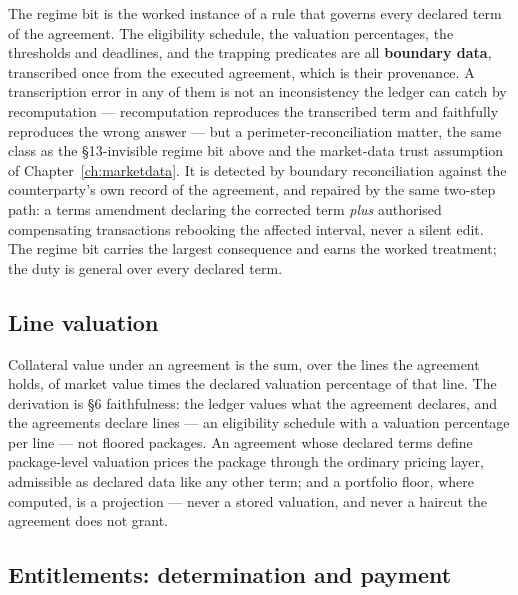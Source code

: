 \documentclass[11pt,a4paper]{article}
\begin{document}
\medskip
The regime bit is the worked instance of a rule that governs every declared term of the
agreement. The eligibility schedule, the valuation percentages, the thresholds and
deadlines, and the trapping predicates are all \textbf{boundary data}, transcribed once
from the executed agreement, which is their provenance. A transcription error in any of
them is not an inconsistency the ledger can catch by recomputation --- recomputation
reproduces the transcribed term and faithfully reproduces the wrong answer --- but a
perimeter-reconciliation matter, the same class as the \S13-invisible regime bit above
and the market-data trust assumption of Chapter~\ref{ch:marketdata}. It is detected by
boundary reconciliation against the counterparty's own record of the agreement, and
repaired by the same two-step path: a terms amendment declaring the corrected term
\emph{plus} authorised compensating transactions rebooking the affected interval, never a silent
edit. The regime bit carries the largest consequence and earns the worked treatment;
the duty is general over every declared term.

\subsection{Line valuation}

Collateral value under an agreement is the sum, over the lines the agreement
holds, of market value times the declared valuation percentage of that line.
The derivation is \S6 faithfulness: the ledger values what the agreement
declares, and the agreements declare lines --- an eligibility schedule with a
valuation percentage per line --- not floored packages. An agreement whose
declared terms define package-level valuation prices the package through the
ordinary pricing layer, admissible as declared data like any other term; and a
portfolio floor, where computed, is a projection --- never a stored valuation,
and never a haircut the agreement does not grant.

\subsection{Entitlements: determination and payment}
\end{document}
